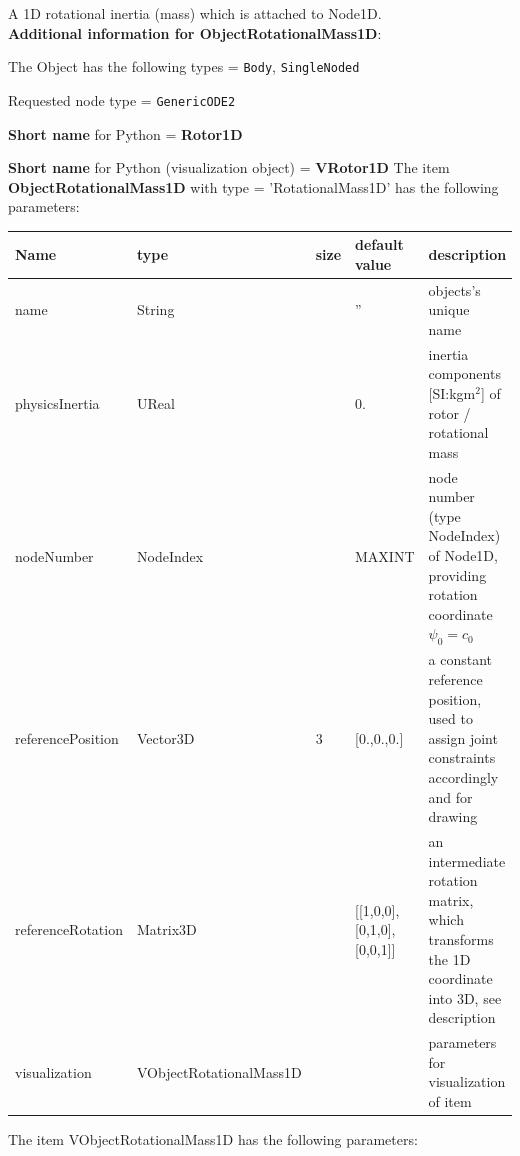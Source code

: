 \label{sec:item:ObjectRotationalMass1D}
A 1D rotational inertia (mass) which is attached to Node1D.\vspace{12pt}
 \\{\bf Additional information for ObjectRotationalMass1D}:
\bi
  \item The Object has the following types = \texttt{Body}, \texttt{SingleNoded}
  \item Requested node type = \texttt{GenericODE2}
  \item {\bf Short name} for Python = {\bf Rotor1D}  \item {\bf Short name} for Python (visualization object) = {\bf VRotor1D}\ei
\vspace{12pt} \noindent The item {\bf ObjectRotationalMass1D} with type = 'RotationalMass1D' has the following parameters:\vspace{-1cm}\\ 
\begin{center}
  \footnotesize
  \begin{longtable}{| p{4.5cm} | p{2.5cm} | p{0.5cm} | p{2.5cm} | p{6cm} |}
    \hline
    \bf Name & \bf type & \bf size & \bf default value & \bf description \\ \hline
    name &     String &      &     '' &     objects's unique name\\ \hline
    physicsInertia &     UReal &      &     0. &     inertia components [SI:kgm$^2$] of rotor / rotational mass\\ \hline
    nodeNumber &     NodeIndex &      &     MAXINT &     node number (type NodeIndex) of Node1D, providing rotation coordinate $\psi_0 = c_0$\\ \hline
    referencePosition &     Vector3D &     3 &     [0.,0.,0.] &     a constant reference position, used to assign joint constraints accordingly and for drawing\\ \hline
    referenceRotation &     Matrix3D &      &     [[1,0,0], [0,1,0], [0,0,1]] &     an intermediate rotation matrix, which transforms the 1D coordinate into 3D, see description\\ \hline
    visualization & VObjectRotationalMass1D & & & parameters for visualization of item \\ \hline
	  \end{longtable}
	\end{center}
The item VObjectRotationalMass1D has the following parameters:\vspace{-1cm}\\ 
